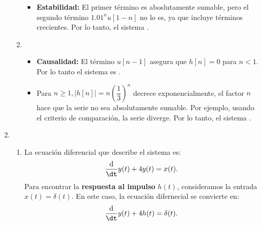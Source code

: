 \begin{enumerate}[label=\color{red}\textbf{\arabic*)}]
\begin{enumerate}[label=\color{red}\textbf{\alph*)}]
\begin{itemize}[label=\textbullet]
      \item \textbf{Estabilidad:} El primer término es aboslutamente sumable, pero el segundo término $1.01^nu[1-n]$ no lo es, ya que incluye términos crecientes. Por lo tanto, el sistema .
      \end{itemize}
    \item {} 
      \begin{itemize}[label=\textbullet]
        \item \textbf{Causalidad:} El término $u[n-1]$  asegura que $h[n]=0$ para  $n<1$. Por lo tanto el sistema es  .
        \item Para $n\ge 1,|h[n]|=n\left( \dfrac{1}{3} \right) ^n$ decrece exponencialmente, el factor $n$ hace que la serie no sea absolutamente sumable. Por ejemplo, usando el criterio de comparación, la serie diverge. Por lo tanto, el sistema  . 
      \end{itemize}
  \end{enumerate}
\item {} 
\begin{enumerate}[label=\color{red}\textbf{\alph*)}]
  \item {}

		La ecuación diferencial que describe el sistema es:
		\[
		\dfrac{\mathrm{d}}{\dt}y(t)+4y(t)=x(t).
		\]
		Para encontrar la \textbf{respuesta al impulso} $h(t)$, consideramos la entrada $x(t)=\delta(t)$. En este caso, la ecuación difernecial se convierte en: \[\dfrac{\mathrm{d}}{\dt}y(t)+4h(t)=\delta(t).\]


\end{enumerate}
\end{enumerate}
